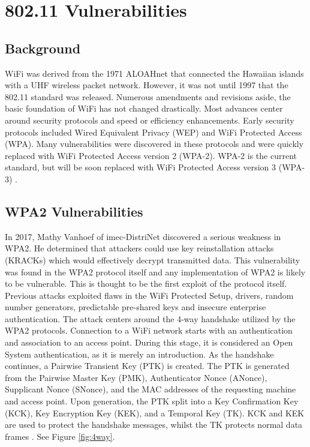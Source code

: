 \documentclass[acmlarge]{style/acmart}
\begin{document}
\section{802.11 Vulnerabilities}


\subsection{Background}

WiFi was derived from the 1971 ALOAHnet that connected the Hawaiian islands with a UHF wireless packet network. However, it was not until 1997 that the 802.11 standard was released. Numerous amendments and revisions aside, the basic foundation of WiFi has not changed drastically. Most advances center around security protocols and speed or efficiency enhancements. Early security protocols included Wired Equivalent Privacy (WEP) and WiFi Protected Access (WPA). Many vulnerabilities were discovered in these protocols and were quickly replaced with WiFi Protected Access version 2 (WPA-2). WPA-2 is the current standard, but will be soon replaced with WiFi Protected Access version 3 (WPA-3) \cite{berg2011ieee}.


\subsection{WPA2 Vulnerabilities}


In 2017, Mathy Vanhoef of imec-DistriNet discovered a serious weakness in WPA2. He determined that attackers could use key reinstallation attacks (KRACKs) which would effectively decrypt transmitted data. This vulnerability was found in the WPA2 protocol itself and any implementation of WPA2 is likely to be vulnerable. This is thought to be the first exploit of the protocol itself. Previous attacks exploited flaws in the WiFi Protected Setup, drivers, random number generators, predictable pre-shared keys and insecure enterprise authentication. 
The attack centers around the 4-way handshake utilized by the WPA2 protocols. Connection to a WiFi network starts with an authentication and association to an access point. During this stage, it is considered an Open System authentication, as it is merely an introduction.  As the handshake continues, a Pairwise Transient Key (PTK) is created. The PTK is generated from the Pairwise Master Key (PMK), Authenticator Nonce (ANonce), Supplicant Nonce (SNonce), and the MAC addresses of the requesting machine and access point. Upon generation, the PTK split into a Key Confirmation Key (KCK), Key Encryption Key (KEK), and a Temporal Key (TK). KCK and KEK are used to protect the handshake messages, whilst the TK protects normal data frames \cite{vanhoef2017key}. See Figure \ref{fig:4way}.
\end{document}
